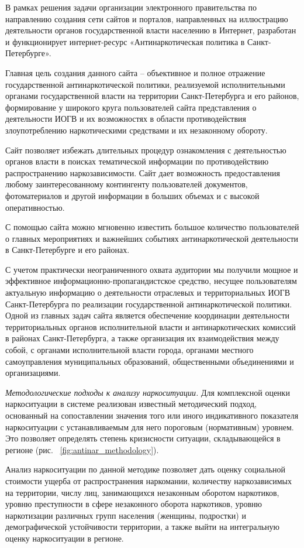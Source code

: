 В рамках решения задачи организации электронного правительства по направлению
создания сети сайтов и порталов, направленных на иллюстрацию деятельности
органов государственной власти населению в Интернет, разработан и функционирует
интернет-ресурс «Антинаркотическая политика в Санкт-Петербурге».

Главная цель создания данного сайта – объективное и полное отражение
государственной антинаркотической политики, реализуемой исполнительными органами
государственной власти на территории Санкт-Петербурга и его районов,
формирование у широкого круга пользователей сайта представления о деятельности
ИОГВ и их возможностях в области противодействия злоупотреблению наркотическими
средствами и их незаконному обороту.

Сайт позволяет избежать длительных процедур ознакомления с деятельностью органов
власти в поисках тематической информации по противодействию распространению
наркозависимости. Сайт дает возможность предоставления любому заинтересованному
контингенту пользователей документов, фотоматериалов и другой информации в
больших объемах и с высокой оперативностью. 

С помощью сайта можно мгновенно известить большое количество пользователей о
главных мероприятиях и важнейших событиях антинаркотической деятельности в
Санкт-Петербурге и его районах.

С учетом практически неограниченного охвата аудитории мы получили мощное и
эффективное информационно-пропагандистское средство, несущее пользователям
актуальную информацию о деятельности отраслевых и территориальных ИОГВ
Санкт-Петербурга по реализации государственной антинаркотической политики. 
Одной из главных задач сайта является обеспечение координации деятельности
территориальных органов исполнительной власти и антинаркотических комиссий в
районах Санкт-Петербурга, а также организация их взаимодействия между собой, с
органами исполнительной власти города, органами местного самоуправления
муниципальных образований, общественными объединениями и организациями.

\textit{Методологические подходы к анализу наркоситуации.}
Для комплексной оценки наркоситуации в системе реализован известный методический
подход, основанный на сопоставлении значения того или иного индикативного
показателя наркоситуации с устанавливаемым для него пороговым (нормативным)
уровнем. Это позволяет определять степень кризисности ситуации, складывающейся в
регионе (рис. ~\ref{fig:antinar_methodology}). 

Анализ наркоситуации по данной методике позволяет дать оценку социальной
стоимости ущерба от распространения наркомании, количеству наркозависимых на
территории, числу лиц, занимающихся незаконным оборотом наркотиков, уровню
преступности в сфере незаконного оборота наркотиков, уровню наркотизации
различных групп населения (женщины, подростки) и демографической устойчивости
территории, а также выйти на интегральную оценку наркоситуации в регионе. 

